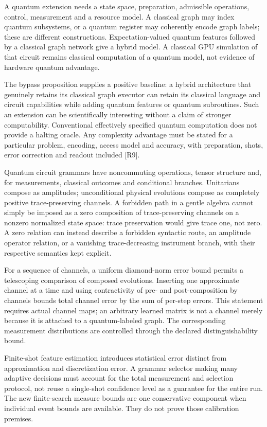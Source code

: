 A quantum extension needs a state space, preparation, admissible operations, control, measurement and a resource model. A classical graph may index quantum subsystems, or a quantum register may coherently encode graph labels; these are different constructions. Expectation-valued quantum features followed by a classical graph network give a hybrid model. A classical GPU simulation of that circuit remains classical computation of a quantum model, not evidence of hardware quantum advantage.

The bypass proposition supplies a positive baseline: a hybrid architecture that genuinely retains its classical graph executor can retain its classical language and circuit capabilities while adding quantum features or quantum subroutines. Such an extension can be scientifically interesting without a claim of stronger computability. Conventional effectively specified quantum computation does not provide a halting oracle. Any complexity advantage must be stated for a particular problem, encoding, access model and accuracy, with preparation, shots, error correction and readout included [R9].

Quantum circuit grammars have noncommuting operations, tensor structure and, for measurements, classical outcomes and conditional branches. Unitarians compose as amplitudes; unconditional physical evolutions compose as completely positive trace-preserving channels. A forbidden path in a gentle algebra cannot simply be imposed as a zero composition of trace-preserving channels on a nonzero normalized state space: trace preservation would give trace one, not zero. A zero relation can instead describe a forbidden syntactic route, an amplitude operator relation, or a vanishing trace-decreasing instrument branch, with their respective semantics kept explicit.

For a sequence of channels, a uniform diamond-norm error bound permits a telescoping comparison of composed evolutions. Inserting one approximate channel at a time and using contractivity of pre- and post-composition by channels bounds total channel error by the sum of per-step errors. This statement requires actual channel maps; an arbitrary learned matrix is not a channel merely because it is attached to a quantum-labeled graph. The corresponding measurement distributions are controlled through the declared distinguishability bound.

Finite-shot feature estimation introduces statistical error distinct from approximation and discretization error. A grammar selector making many adaptive decisions must account for the total measurement and selection protocol, not reuse a single-shot confidence level as a guarantee for the entire run. The new finite-search measure bounds are one conservative component when individual event bounds are available. They do not prove those calibration premises.


